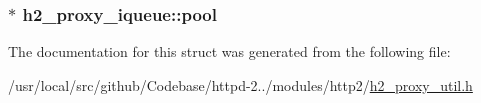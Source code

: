 \subsubsection[{\texorpdfstring{pool}{pool}}]{$\ast$ h2\+\_\+proxy\+\_\+iqueue\+::pool}\hypertarget{structh2__proxy__iqueue_a3bb620009fcc283b68f5f73d9a197c79}{}\label{structh2__proxy__iqueue_a3bb620009fcc283b68f5f73d9a197c79}


The documentation for this struct was generated from the following file\+:\begin{DoxyCompactItemize}
\item 
/usr/local/src/github/\+Codebase/httpd-\/2../modules/http2/\hyperlink{h2__proxy__util_8h}{h2\+\_\+proxy\+\_\+util.\+h}\end{DoxyCompactItemize}
